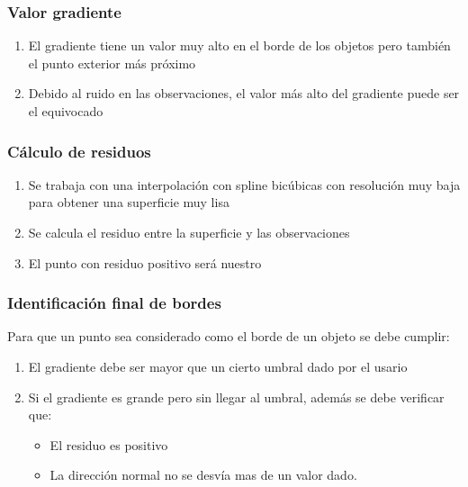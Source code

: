 \begin{frame}
  \frametitle{Valor gradiente}
  \begin{enumerate}[<+->]
   \item El gradiente tiene un valor muy alto en el borde de los objetos pero también el punto exterior más próximo
   \item Debido al ruido en las observaciones, el valor más alto del gradiente \alert<2>{puede ser el equivocado}
  \end{enumerate}
\end{frame}
\begin{frame}
  \frametitle{Cálculo de residuos}%
  \begin{enumerate}[<+->]%
   \item Se trabaja con una interpolación con spline bicúbicas con resolución muy baja para obtener una \alert<1>{superficie muy lisa}%
   \item Se calcula el residuo entre la superficie y las observaciones%
   \item El punto con residuo positivo será nuestro %
  \end{enumerate}%
\end{frame}
\begin{frame}
  \frametitle{Identificación final de bordes}%
  Para que un punto sea considerado como el borde de un objeto se debe cumplir:
  \begin{enumerate}[<+->]%
	\item El gradiente debe ser mayor que un cierto umbral dado por el usario
	\item Si el gradiente es grande pero \alert<2>{sin} llegar al umbral, además se debe verificar que:
	\begin{itemize}
	 \item El residuo es \alert<3>{positivo}
	 \item La dirección normal no se desvía mas de un valor dado.
	\end{itemize}
  \end{enumerate}
\end{frame}
